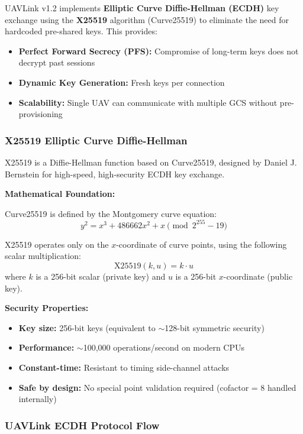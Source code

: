 \documentclass[11pt,a4paper]{article}
\begin{document}
UAVLink v1.2 implements \textbf{Elliptic Curve Diffie-Hellman (ECDH)} key exchange using the \textbf{X25519} algorithm (Curve25519) to eliminate the need for hardcoded pre-shared keys. This provides:

\begin{itemize}[noitemsep]
    \item \textbf{Perfect Forward Secrecy (PFS):} Compromise of long-term keys does not decrypt past sessions
    \item \textbf{Dynamic Key Generation:} Fresh keys per connection
    \item \textbf{Scalability:} Single UAV can communicate with multiple GCS without pre-provisioning
\end{itemize}

\subsubsection{X25519 Elliptic Curve Diffie-Hellman}

X25519 is a Diffie-Hellman function based on Curve25519, designed by Daniel J. Bernstein for high-speed, high-security ECDH key exchange.

\textbf{Mathematical Foundation:}

Curve25519 is defined by the Montgomery curve equation:
$$y^2 = x^3 + 486662x^2 + x \pmod{2^{255} - 19}$$

X25519 operates only on the $x$-coordinate of curve points, using the following scalar multiplication:
$$\text{X25519}(k, u) = k \cdot u$$
where $k$ is a 256-bit scalar (private key) and $u$ is a 256-bit $x$-coordinate (public key).

\textbf{Security Properties:}
\begin{itemize}[noitemsep]
    \item \textbf{Key size:} 256-bit keys (equivalent to $\sim$128-bit symmetric security)
    \item \textbf{Performance:} $\sim$100,000 operations/second on modern CPUs
    \item \textbf{Constant-time:} Resistant to timing side-channel attacks
    \item \textbf{Safe by design:} No special point validation required (cofactor = 8 handled internally)
\end{itemize}

\subsubsection{UAVLink ECDH Protocol Flow}
\end{document}

